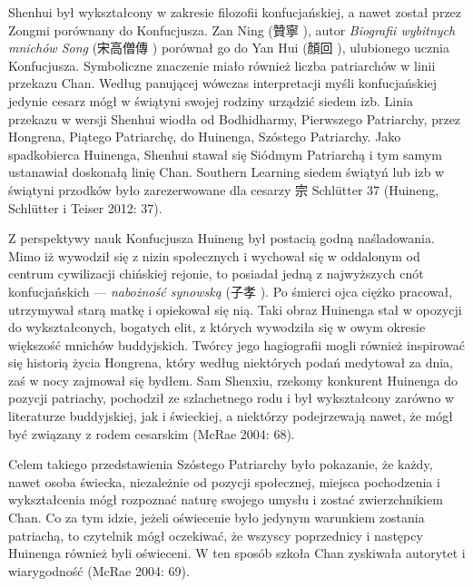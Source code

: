 Shenhui był wykształcony w zakresie filozofii konfucjańskiej, a nawet został przez Zongmi porównany do Konfucjusza. Zan Ning (贊寧 ), autor \textit{Biografii wybitnych mnichów Song} (宋高僧傳 ) porównał go do Yan Hui (顏回 ), ulubionego ucznia Konfucjusza.
Symboliczne znaczenie miało również liczba patriarchów w linii przekazu Chan. Według panującej wówczas interpretacji myśli konfucjańskiej jedynie cesarz mógł w świątyni swojej rodziny urządzić siedem izb. Linia przekazu w wersji Shenhui wiodła od Bodhidharmy, Pierwszego Patriarchy, przez Hongrena, Piątego Patriarchę, do Huinenga, Szóstego Patriarchy. Jako spadkobierca Huinenga, Shenhui stawał się Siódmym Patriarchą i tym samym ustanawiał doskonałą linię Chan.
Southern Learning
siedem świątyń lub izb w świątyni przodków było zarezerwowane dla cesarzy
宗
Schlütter 37 \fi
(Huineng, Schlütter i Teiser 2012: 37).

Z perspektywy nauk Konfucjusza Huineng był postacią godną naśladowania. Mimo iż wywodził się z nizin społecznych i wychował się w oddalonym od centrum cywilizacji chińskiej rejonie, to posiadał jedną z najwyższych cnót konfucjańskich --- \textit{nabożność synowską} (子孝 ). Po śmierci ojca ciężko pracował, utrzymywał starą matkę i opiekował się nią. Taki obraz Huinenga stał w opozycji do wykształconych, bogatych elit, z których wywodziła się w owym okresie większość mnichów buddyjskich. Twórcy jego hagiografii mogli również inspirować się historią życia Hongrena, który według niektórych podań medytował za dnia, zaś w nocy zajmował się bydłem. Sam Shenxiu, rzekomy konkurent Huinenga do pozycji patriachy, pochodził ze szlachetnego rodu i był wykształcony zarówno w literaturze buddyjskiej, jak i świeckiej, a niektórzy podejrzewają nawet, że mógł być związany z rodem cesarskim (McRae 2004: 68).

Celem takiego przedstawienia Szóstego Patriarchy było pokazanie, że każdy, nawet osoba świecka, niezależnie od pozycji społecznej, miejsca pochodzenia i wykształcenia mógł rozpoznać naturę swojego umysłu i zostać zwierzchnikiem Chan. Co za tym idzie, jeżeli oświecenie było jedynym warunkiem zostania patriachą, to czytelnik mógł oczekiwać, że wszyscy poprzednicy i następcy Huinenga również byli oświeceni. W ten sposób szkoła Chan zyskiwała autorytet i wiarygodność (McRae 2004: 69).
